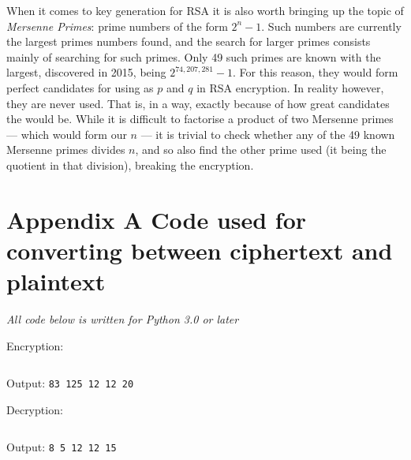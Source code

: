 \documentclass[12pt, titlepage]{article}
\let\oldsection\section
\renewcommand\section{\clearpage\oldsection}
\begin{document}
When it comes to key generation for RSA it is also worth bringing up the topic of
\emph{Mersenne Primes}:\autocite[33]{dence} prime numbers of the form $2^n - 1$. Such
numbers are currently the largest primes numbers found, and the search for larger primes
consists mainly of searching for such primes. Only 49 such primes are known with the
largest, discovered in 2015, being $2^{74,207,281} - 1$.\autocite{newscientist_mersenne} For
this reason, they would form perfect candidates for using as $p$ and $q$ in RSA encryption.
In reality however, they are never used. That is, in a way, exactly because of how great
candidates the would be. While it is difficult to factorise a product of two Mersenne primes
--- which would form our $n$ --- it is trivial to check whether any of the 49 known Mersenne
primes divides $n$, and so also find the other prime used (it being the quotient in that
division), breaking the encryption.

\printbibliography

\appendix

\section*{Appendix A \hspace{0.5em} Code used for converting between ciphertext and plaintext}
\label{sec:code_appendix}

\textit{All code below is written for Python 3.0 or later}

Encryption: \vspace{-5mm}
\inputminted{python}{encrypt.py}
\vspace{-5mm}
Output: \texttt{83 125 12 12 20}

Decryption: \vspace{-5mm}
\inputminted{python}{decrypt.py}
\vspace{-5mm}
Output: \texttt{8 5 12 12 15}
\end{document}
